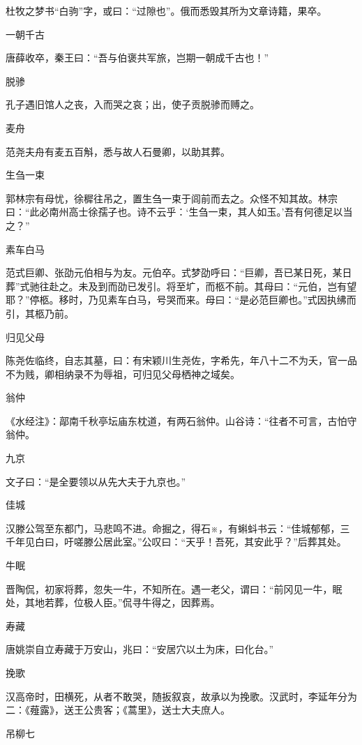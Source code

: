 \documentclass[a4paper,12pt,UTF8,twoside]{ctexbook}
\begin{document}
    杜牧之梦书“白驹”字，或曰：“过隙也”。俄而悉毁其所为文章诗籍，果卒。
    
    一朝千古
    
    唐薛收卒，秦王曰：“吾与伯褒共军旅，岂期一朝成千古也！”
    
    脱骖
    
    孔子遇旧馆人之丧，入而哭之哀；出，使子贡脱骖而赙之。
    
    麦舟
    
    范尧夫舟有麦五百斛，悉与故人石曼卿，以助其葬。
    
    生刍一束
    
    郭林宗有母忧，徐穉往吊之，置生刍一束于闾前而去之。众怪不知其故。林宗曰：“此必南州高士徐孺子也。诗不云乎：‘生刍一束，其人如玉。’吾有何德足以当之？”
    
    素车白马
    
    范式巨卿、张劭元伯相与为友。元伯卒。式梦劭呼曰：“巨卿，吾已某日死，某日葬”式驰往赴之。未及到而劭已发引。将至圹，而柩不前。其母曰：“元伯，岂有望耶？”停柩。移时，乃见素车白马，号哭而来。母曰：“是必范巨卿也。”式因执绋而引，其柩乃前。
    
    归见父母
    
    陈尧佐临终，自志其墓，曰：有宋颖川生尧佐，字希先，年八十二不为夭，官一品不为贱，卿相纳录不为辱祖，可归见父母栖神之域矣。
    
    翁仲
    
    《水经注》：鄗南千秋亭坛庙东枕道，有两石翁仲。山谷诗：“往者不可言，古怕守翁仲。
    
    九京
    
    文子曰：“是全要领以从先大夫于九京也。”
    
    佳城
    
    汉滕公驾至东都门，马悲鸣不进。命掘之，得石※，有蝌蚪书云：“佳城郁郁，三千年见白曰，吁嗟滕公居此室。”公叹曰：“天乎！吾死，其安此乎？”后葬其处。
    
    牛眠
    
    晋陶侃，初家将葬，忽失一牛，不知所在。遇一老父，谓曰：“前冈见一牛，眠处，其地若葬，位极人臣。”侃寻牛得之，因葬焉。
    
    寿藏
    
    唐姚崇自立寿藏于万安山，兆曰：“安居穴以土为床，曰化台。”
    
    挽歌
    
    汉高帝时，田横死，从者不敢哭，随扳叙哀，故承以为挽歌。汉武时，李延年分为二：《薤露》，送王公贵客；《蒿里》，送士大夫庶人。
    
    吊柳七
    
\end{document}
